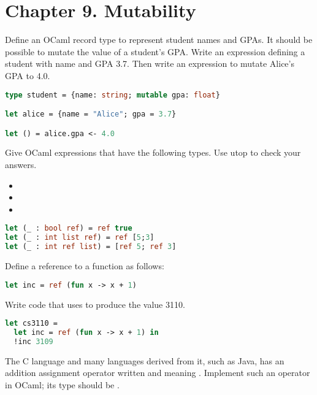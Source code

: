 
\section*{Chapter 9. Mutability}

Define an OCaml record type to represent student names and GPAs. It should be possible to mutate the value of a student's
GPA. Write an expression defining a student with name  and GPA 3.7. Then write an expression to mutate
Alice's GPA to 4.0.

\begin{lstlisting}[language=OCaml]
type student = {name: string; mutable gpa: float}

let alice = {name = "Alice"; gpa = 3.7}

let () = alice.gpa <- 4.0
\end{lstlisting}

\problem[refs]
Give OCaml expressions that have the following types. Use utop to check your answers.
\begin{itemize}
	\item {}
	\item {}
	\item {}
\end{itemize}

\begin{lstlisting}[language=OCaml]
let (_ : bool ref) = ref true
let (_ : int list ref) = ref [5;3]
let (_ : int ref list) = [ref 5; ref 3]
\end{lstlisting}

Define a reference to a function as follows:
\begin{lstlisting}[language=OCaml]
let inc = ref (fun x -> x + 1)
\end{lstlisting}
Write code that uses  to produce the value 3110.

\begin{lstlisting}[language=OCaml]
let cs3110 =
  let inc = ref (fun x -> x + 1) in
  !inc 3109
\end{lstlisting}

The C language and many languages derived from it, such as Java, has an addition assignment operator written  and meaning . Implement such an operator in OCaml; its type should be .

